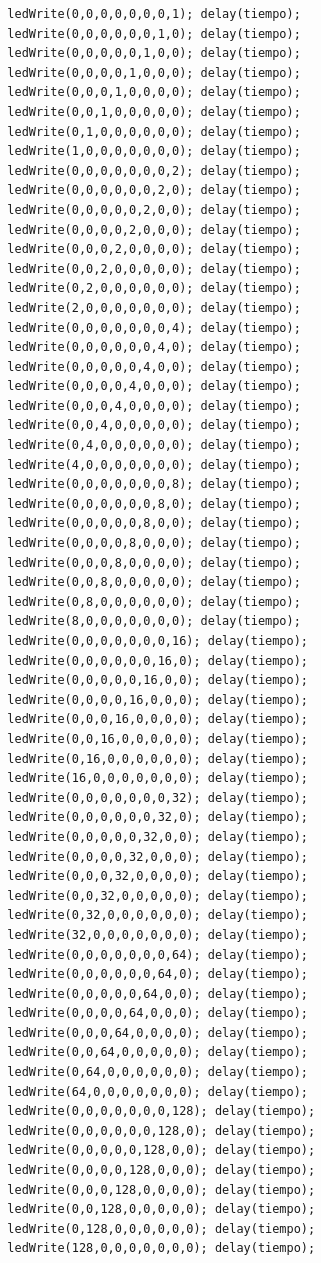 \documentclass{article}
\begin{document}
\begin{verbatim}
  ledWrite(0,0,0,0,0,0,0,1); delay(tiempo);
  ledWrite(0,0,0,0,0,0,1,0); delay(tiempo);
  ledWrite(0,0,0,0,0,1,0,0); delay(tiempo);
  ledWrite(0,0,0,0,1,0,0,0); delay(tiempo);
  ledWrite(0,0,0,1,0,0,0,0); delay(tiempo);
  ledWrite(0,0,1,0,0,0,0,0); delay(tiempo);
  ledWrite(0,1,0,0,0,0,0,0); delay(tiempo);
  ledWrite(1,0,0,0,0,0,0,0); delay(tiempo);
  ledWrite(0,0,0,0,0,0,0,2); delay(tiempo);
  ledWrite(0,0,0,0,0,0,2,0); delay(tiempo);
  ledWrite(0,0,0,0,0,2,0,0); delay(tiempo);
  ledWrite(0,0,0,0,2,0,0,0); delay(tiempo);
  ledWrite(0,0,0,2,0,0,0,0); delay(tiempo);
  ledWrite(0,0,2,0,0,0,0,0); delay(tiempo);
  ledWrite(0,2,0,0,0,0,0,0); delay(tiempo);
  ledWrite(2,0,0,0,0,0,0,0); delay(tiempo);
  ledWrite(0,0,0,0,0,0,0,4); delay(tiempo);
  ledWrite(0,0,0,0,0,0,4,0); delay(tiempo);
  ledWrite(0,0,0,0,0,4,0,0); delay(tiempo);
  ledWrite(0,0,0,0,4,0,0,0); delay(tiempo);
  ledWrite(0,0,0,4,0,0,0,0); delay(tiempo);
  ledWrite(0,0,4,0,0,0,0,0); delay(tiempo);
  ledWrite(0,4,0,0,0,0,0,0); delay(tiempo);
  ledWrite(4,0,0,0,0,0,0,0); delay(tiempo);
  ledWrite(0,0,0,0,0,0,0,8); delay(tiempo);
  ledWrite(0,0,0,0,0,0,8,0); delay(tiempo);
  ledWrite(0,0,0,0,0,8,0,0); delay(tiempo);
  ledWrite(0,0,0,0,8,0,0,0); delay(tiempo);
  ledWrite(0,0,0,8,0,0,0,0); delay(tiempo);
  ledWrite(0,0,8,0,0,0,0,0); delay(tiempo);
  ledWrite(0,8,0,0,0,0,0,0); delay(tiempo);
  ledWrite(8,0,0,0,0,0,0,0); delay(tiempo);
  ledWrite(0,0,0,0,0,0,0,16); delay(tiempo);
  ledWrite(0,0,0,0,0,0,16,0); delay(tiempo);
  ledWrite(0,0,0,0,0,16,0,0); delay(tiempo);
  ledWrite(0,0,0,0,16,0,0,0); delay(tiempo);
  ledWrite(0,0,0,16,0,0,0,0); delay(tiempo);
  ledWrite(0,0,16,0,0,0,0,0); delay(tiempo);
  ledWrite(0,16,0,0,0,0,0,0); delay(tiempo);
  ledWrite(16,0,0,0,0,0,0,0); delay(tiempo);
  ledWrite(0,0,0,0,0,0,0,32); delay(tiempo);
  ledWrite(0,0,0,0,0,0,32,0); delay(tiempo);
  ledWrite(0,0,0,0,0,32,0,0); delay(tiempo);
  ledWrite(0,0,0,0,32,0,0,0); delay(tiempo);
  ledWrite(0,0,0,32,0,0,0,0); delay(tiempo);
  ledWrite(0,0,32,0,0,0,0,0); delay(tiempo);
  ledWrite(0,32,0,0,0,0,0,0); delay(tiempo);
  ledWrite(32,0,0,0,0,0,0,0); delay(tiempo);
  ledWrite(0,0,0,0,0,0,0,64); delay(tiempo);
  ledWrite(0,0,0,0,0,0,64,0); delay(tiempo);
  ledWrite(0,0,0,0,0,64,0,0); delay(tiempo);
  ledWrite(0,0,0,0,64,0,0,0); delay(tiempo);
  ledWrite(0,0,0,64,0,0,0,0); delay(tiempo);
  ledWrite(0,0,64,0,0,0,0,0); delay(tiempo);
  ledWrite(0,64,0,0,0,0,0,0); delay(tiempo);
  ledWrite(64,0,0,0,0,0,0,0); delay(tiempo);
  ledWrite(0,0,0,0,0,0,0,128); delay(tiempo);
  ledWrite(0,0,0,0,0,0,128,0); delay(tiempo);
  ledWrite(0,0,0,0,0,128,0,0); delay(tiempo);
  ledWrite(0,0,0,0,128,0,0,0); delay(tiempo);
  ledWrite(0,0,0,128,0,0,0,0); delay(tiempo);
  ledWrite(0,0,128,0,0,0,0,0); delay(tiempo);
  ledWrite(0,128,0,0,0,0,0,0); delay(tiempo);
  ledWrite(128,0,0,0,0,0,0,0); delay(tiempo);
  

\end{verbatim}
\end{document}
